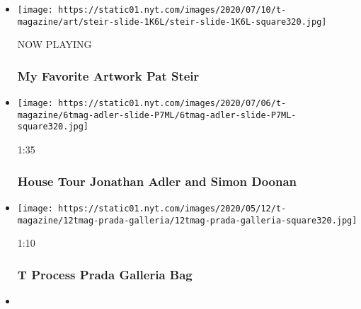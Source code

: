 \begin{itemize}
\item
  \texttt{[image: https://static01.nyt.com/images/2020/07/10/t-magazine/art/steir-slide-1K6L/steir-slide-1K6L-square320.jpg]}

  NOW PLAYING

  \hypertarget{my-favorite-artwork--pat-steir-2}{%
  \subsubsection{My Favorite Artwork \textbar{} Pat
  Steir}\label{my-favorite-artwork--pat-steir-2}}
\item
  \href{https://www.nytimes.com/video/t-magazine/100000007212774/house-tour-jonathan-adler-and-simon-doonan.html?action=click\&module=video-series-bar\&region=header\&pgtype=Article\&playlistId=video/t-magazine}{}

  \texttt{[image: https://static01.nyt.com/images/2020/07/06/t-magazine/6tmag-adler-slide-P7ML/6tmag-adler-slide-P7ML-square320.jpg]}

  1:35

  \hypertarget{house-tour--jonathan-adler-and-simon-doonan}{%
  \subsubsection{House Tour \textbar{} Jonathan Adler and Simon
  Doonan}\label{house-tour--jonathan-adler-and-simon-doonan}}
\item
  \href{https://www.nytimes.com/video/t-magazine/100000007129787/t-process-prada-galleria-bag.html?action=click\&module=video-series-bar\&region=header\&pgtype=Article\&playlistId=video/t-magazine}{}

  \texttt{[image: https://static01.nyt.com/images/2020/05/12/t-magazine/12tmag-prada-galleria/12tmag-prada-galleria-square320.jpg]}

  1:10

  \hypertarget{t-process--prada-galleria-bag}{%
  \subsubsection{T Process \textbar{} Prada Galleria
  Bag}\label{t-process--prada-galleria-bag}}
\item
  \href{https://www.nytimes.com/video/t-magazine/100000007075532/butches-and-studs-in-their-own-words.html?action=click\&module=video-series-bar\&region=header\&pgtype=Article\&playlistId=video/t-magazine}{}


\end{itemize}

